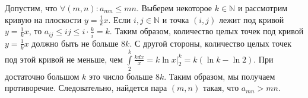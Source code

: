 \documentclass{article}
\begin{document}
Допустим, что $\forall (m,n) \colon a_{mn} \leqslant mn$. Выберем некоторое $k \in \mathbb{N}$ и рассмотрим кривую на плоскости $y=\frac{1}{k} x$. Если $i,j \in \mathbb{N}$ и точка $(i,j)$ лежит под кривой $y = \frac{1}{k} x$, то $a_{ij} \leqslant ij \leqslant i \cdot \frac{k}{i} = k$. Таким образом, количество целых точек под кривой $y = \frac{1}{k} x$ должно быть не больше $8k$. С другой стороны, количество целых точек под этой кривой не меньше, чем $\int\limits_2^k \frac{kdx}{x} = k \ln x |_2^k = k(\ln k - \ln 2)$. При достаточно большом $k$ это число больше $8k$. Таким образом, мы получаем противоречие. Следовательно, найдется пара $(m,n)$ такая, что $a_{mn} > mn$.
\end{document}
